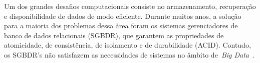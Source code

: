 \documentclass[12pt]{article}
\begin{document}
Um dos grandes desafios computacionais consiste no armazenamento, recuperação e disponibilidade de dados de modo eficiente.
Durante muitos anos, a solução para a maioria dos problemas dessa área foram os sistemas gerenciadores de banco de dados relacionais (SGBDR), que garantem as propriedades de atomicidade, de consistência, de isolamento e de durabilidade (ACID). 
Contudo, os SGBDR’s não satisfazem as necessidades de sistemas no âmbito de~\emph{Big Data}~\cite{brito2010bancos}.
\end{document}
